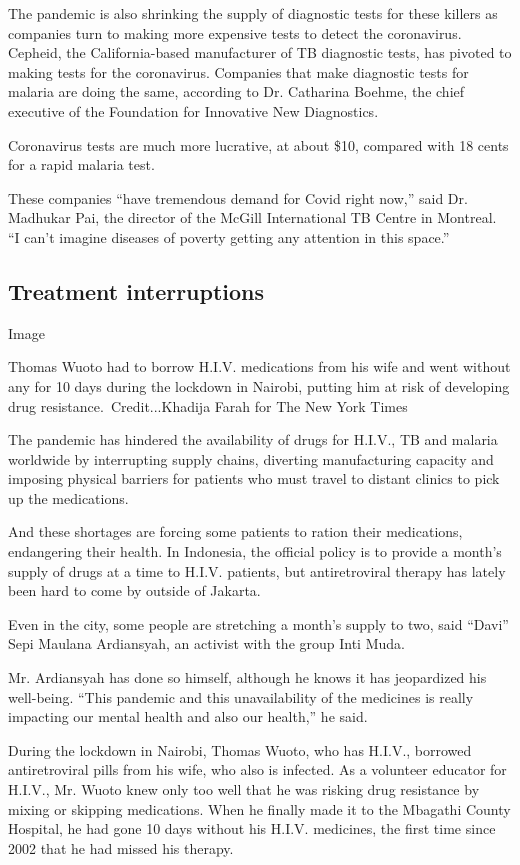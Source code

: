 The pandemic is also shrinking the supply of diagnostic tests for these
killers as companies turn to making more expensive tests to detect the
coronavirus. Cepheid, the California-based manufacturer of TB diagnostic
tests, has pivoted to making tests for the coronavirus. Companies that
make diagnostic tests for malaria are doing the same, according to Dr.
Catharina Boehme, the chief executive of the Foundation for Innovative
New Diagnostics.

Coronavirus tests are much more lucrative, at about \$10, compared with
18 cents for a rapid malaria test.

These companies ``have tremendous demand for Covid right now,'' said Dr.
Madhukar Pai, the director of the McGill International TB Centre in
Montreal. ``I can't imagine diseases of poverty getting any attention in
this space.''

\hypertarget{treatment-interruptions}{%
\subsection{Treatment interruptions}\label{treatment-interruptions}}

Image

Thomas Wuoto had to borrow H.I.V. medications from his wife and went
without any for 10 days during the lockdown in Nairobi, putting him at
risk of developing drug resistance.~Credit...Khadija Farah for The New
York Times

The pandemic has hindered the availability of drugs for H.I.V., TB and
malaria worldwide by interrupting supply chains, diverting manufacturing
capacity and imposing physical barriers for patients who must travel to
distant clinics to pick up the medications.

And these shortages are forcing some patients to ration their
medications, endangering their health. In Indonesia, the official policy
is to provide a month's supply of drugs at a time to H.I.V. patients,
but antiretroviral therapy has lately been hard to come by outside of
Jakarta.

Even in the city, some people are stretching a month's supply to two,
said ``Davi'' Sepi Maulana Ardiansyah, an activist with the group Inti
Muda.

Mr. Ardiansyah has done so himself, although he knows it has jeopardized
his well-being. ``This pandemic and this unavailability of the medicines
is really impacting our mental health and also our health,'' he said.

During the lockdown in Nairobi, Thomas Wuoto, who has H.I.V., borrowed
antiretroviral pills from his wife, who also is infected. As a volunteer
educator for H.I.V., Mr. Wuoto knew only too well that he was risking
drug resistance by mixing or skipping medications. When he finally made
it to the Mbagathi County Hospital, he had gone 10 days without his
H.I.V. medicines, the first time since 2002 that he had missed his
therapy.

